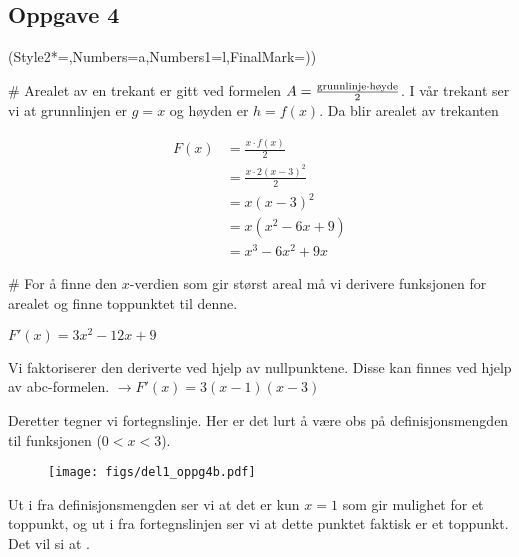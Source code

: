 \subsection*{Oppgave 4}
\begin{easylist}[enumerate]
	\ListProperties(Style2*=,Numbers=a,Numbers1=l,FinalMark={)})
	
	# Arealet av en trekant er gitt ved formelen $A = \frac{\textnormal{grunnlinje} \cdot \textnormal{høyde}}{2}$. I vår trekant ser vi at grunnlinjen er $g = x$ og høyden er $h = f(x)$. Da blir arealet av trekanten
	
	\begin{align*}
		F(x) & = \frac{x \cdot f(x)}{2} \\
		& = \frac{x \cdot 2(x-3)^2}{2} \\
		& = x(x-3)^2 \\
		& = x(x^2 - 6x + 9) \\
		& = x^3 - 6x^2 +9x
	\end{align*}
	
	# For å finne den $x$-verdien som gir størst areal må vi derivere funksjonen for arealet og finne toppunktet til denne. 
	
	$F'(x) = 3x^2 - 12x + 9$
	
	Vi faktoriserer den deriverte ved hjelp av nullpunktene. Disse kan finnes ved hjelp av abc-formelen. $\rightarrow F'(x) = 3(x-1)(x-3)$
	
	Deretter tegner vi fortegnslinje. Her er det lurt å være obs på definisjonsmengden til funksjonen ($0<x<3$).
	
		\begin{figure}[ht!]
			\centering
			\texttt{[image: figs/del1\_oppg4b.pdf]}
			\label{fig:del1_oppg4c}
		\end{figure}
		
		Ut i fra definisjonsmengden ser vi at det er kun $x = 1$ som gir mulighet for et toppunkt, og ut i fra fortegnslinjen ser vi at dette punktet faktisk er et toppunkt. Det vil si at .
	
	
	
\end{easylist}	
